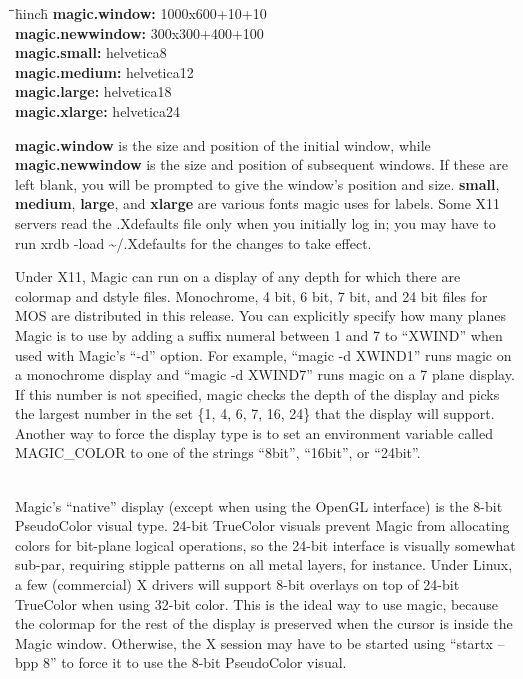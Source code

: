 \documentclass[letterpaper,twoside,12pt]{article}
\def\hinch{\hspace*{0.5in}}
\def\starti{\begin{center}\begin{tabbing}\hinch\=\hinch\=\hinch\=hinch\hinch\=\kill}
\def\endi{\end{tabbing}\end{center}}
\def\ii{\>\>\>}
\begin{document}
\starti
   \> {\bfseries magic.window:}    \ii  1000x600+10+10 \\
   \> {\bfseries magic.newwindow:} \ii  300x300+400+100 \\
   \> {\bfseries magic.small:}     \ii  helvetica8 \\
   \> {\bfseries magic.medium:}    \ii  helvetica12 \\
   \> {\bfseries magic.large:}     \ii  helvetica18 \\
   \> {\bfseries magic.xlarge:}    \ii  helvetica24
\endi

{\bfseries magic.window} is the size and position of the initial window,
while {\bfseries magic.newwindow} is the size and position of subsequent 
windows.  If these are left blank, you will be prompted to give 
the window's position and size. {\bfseries small}, {\bfseries medium},
{\bfseries large},  and {\bfseries xlarge} are various fonts magic uses
for labels.  
Some X11 servers read the {\ttfamily .Xdefaults} file only when you initially
log in; you may have to run {\ttfamily xrdb -load \~{}/.Xdefaults}
for the changes to take 
effect.

Under X11, Magic can run on a display of any depth for which there are
colormap and dstyle files.  Monochrome, 4 bit, 6 bit, 7 bit, and 24 bit
files for MOS are distributed in this release.  You can explicitly specify 
how many planes Magic is to use by adding a suffix numeral between 
1 and 7 to ``XWIND'' when used with Magic's ``-d'' option.  
For example, ``magic -d XWIND1'' runs magic on a monochrome 
display and ``magic -d XWIND7'' runs magic on a 7 plane display.  
If this number is not specified, magic checks the depth of the display
and picks the largest number in the set \{1, 4, 6, 7, 16, 24\} that the display
will support.
Another way to force the display type is to set an environment variable
called {\ttfamily MAGIC\_COLOR} to one of the strings ``8bit'', ``16bit'',
or ``24bit''.

\medskip
{} \\
Magic's ``native'' display (except when using the OpenGL interface)
is the 8-bit PseudoColor visual type.  24-bit TrueColor visuals prevent
Magic from allocating colors for bit-plane logical operations, so the
24-bit interface is visually somewhat sub-par, requiring stipple
patterns on all metal layers, for instance.  Under Linux, a few
(commercial) X drivers will support 8-bit overlays on top of 24-bit
TrueColor when using 32-bit color.  This is the ideal way to use
magic, because the colormap for the rest of the display is preserved
when the cursor is inside the Magic window.  Otherwise, the X session
may have to be started using ``{\ttfamily startx --bpp 8}'' to force
it to use the 8-bit PseudoColor visual.
  
\end{document}
